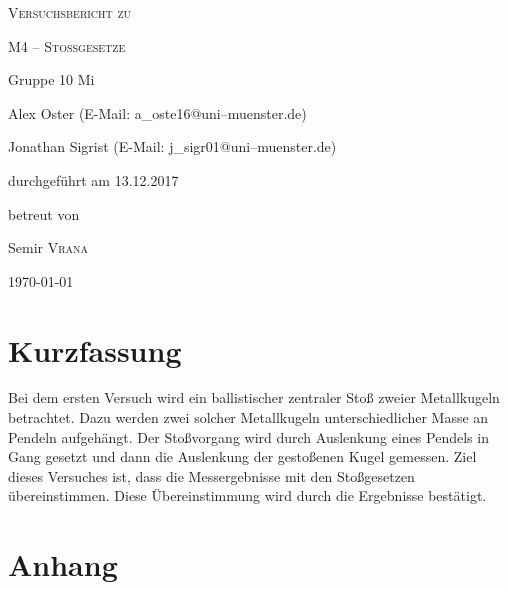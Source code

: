 \documentclass[11pt,a4paper,titlepage, ngerman]{article}
\begin{document}
	\begin{titlepage}
		\centering
		{\scshape\LARGE Versuchsbericht zu \par}
		\vspace{1cm}
		{\scshape\huge M4 -- Stoßgesetze\par}
		\vspace{2.5cm}
		{\LARGE Gruppe 10 Mi\par}
		\vspace{0.5cm}
		{\large Alex Oster (E-Mail: a\_oste16@uni--muenster.de) \par}
		{\large Jonathan Sigrist (E-Mail: j\_sigr01@uni--muenster.de) \par}
		\vfill
		durchgeführt am 13.12.2017\par
		betreut von\par
		{\large Semir \textsc{Vrana}} 
		\vfill	
		{\large \today\par}
	\end{titlepage}
	
	\tableofcontents
	
	\newpage
	
	\section{Kurzfassung}
	
	
			Bei dem ersten Versuch wird ein ballistischer zentraler Stoß zweier Metallkugeln betrachtet. Dazu werden zwei solcher Metallkugeln unterschiedlicher Masse an Pendeln aufgehängt. Der Stoßvorgang wird durch Auslenkung eines Pendels in Gang gesetzt und dann die Auslenkung der gestoßenen Kugel gemessen. Ziel dieses Versuches ist, dass die Messergebnisse mit den Stoßgesetzen übereinstimmen. Diese Übereinstimmung wird durch die Ergebnisse bestätigt.
		
	\vspace{2cm}	
	
	 
	\newpage
	
	
	\newpage
	
	\section{Anhang}
	
\end{document}
